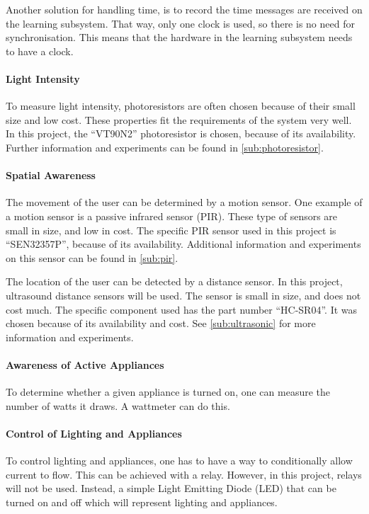 Another solution for handling time, is to record the time messages are received on the learning subsystem. That way, only one clock is used, so there is no need for synchronisation. This means that the hardware in the learning subsystem needs to have a clock.

\paragraph{Light Intensity}
To measure light intensity, photoresistors are often chosen because of their small size and low cost. These properties fit the requirements of the system very well. In this project, the \enquote{VT90N2} photoresistor is chosen, because of its availability. Further information and experiments can be found in \cref{sub:photoresistor}.

\paragraph{Spatial Awareness}
The movement of the user can be determined by a motion sensor. One example of a motion sensor is a passive infrared sensor (PIR). These type of sensors are small in size, and low in cost. The specific PIR sensor used in this project is \enquote{SEN32357P}, because of its availability. Additional information and experiments on this sensor can be found in \cref{sub:pir}.

The location of the user can be detected by a distance sensor. In this project, ultrasound distance sensors will be used. The sensor is small in size, and does not cost much. The specific component used has the part number \enquote{HC-SR04}. It was chosen because of its availability and cost. See \cref{sub:ultrasonic} for more information and experiments.

\paragraph{Awareness of Active Appliances}
To determine whether a given appliance is turned on, one can measure the number of watts it draws. A wattmeter can do this.

\paragraph{Control of Lighting and Appliances}
To control lighting and appliances, one has to have a way to conditionally allow current to flow. This can be achieved with a relay. However, in this project, relays will not be used. Instead, a simple Light Emitting Diode (LED) that can be turned on and off which will represent lighting and appliances.

